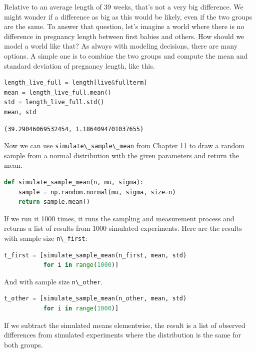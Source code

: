 Relative to an average length of 39 weeks, that's not a very big
difference. We might wonder if a difference as big as this would be
likely, even if the two groups are the same. To answer that question,
let's imagine a world where there is no difference in pregnancy length
between first babies and others. How should we model a world like that?
As always with modeling decisions, there are many options. A simple one
is to combine the two groups and compute the mean and standard deviation
of pregnancy length, like this.

\begin{lstlisting}[language=Python,style=source]
length_live_full = length[live&fullterm]
mean = length_live_full.mean()
std = length_live_full.std()
mean, std
\end{lstlisting}

\begin{lstlisting}[style=output]
(39.29046069532454, 1.1864094701037655)
\end{lstlisting}

Now we can use \passthrough{\lstinline!simulate\_sample\_mean!} from
Chapter 11 to draw a random sample from a normal distribution with the
given parameters and return the mean.

\begin{lstlisting}[language=Python,style=source]
def simulate_sample_mean(n, mu, sigma):
    sample = np.random.normal(mu, sigma, size=n)
    return sample.mean()
\end{lstlisting}

If we run it 1000 times, it runs the sampling and measurement process
and returns a list of results from 1000 simulated experiments. Here are
the results with sample size \passthrough{\lstinline!n\_first!}:

\begin{lstlisting}[language=Python,style=source]
t_first = [simulate_sample_mean(n_first, mean, std)
           for i in range(1000)]
\end{lstlisting}

And with sample size \passthrough{\lstinline!n\_other!}.

\begin{lstlisting}[language=Python,style=source]
t_other = [simulate_sample_mean(n_other, mean, std)
           for i in range(1000)]
\end{lstlisting}

If we subtract the simulated means elementwise, the result is a list of
observed differences from simulated experiments where the distribution
is the same for both groups.

